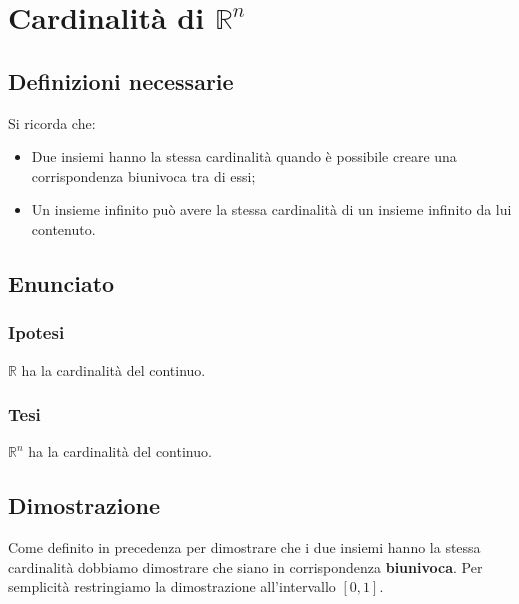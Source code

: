 \documentclass[../../dimostrazioni]{subfiles}
\begin{document}
    \chapter{Cardinalità \texorpdfstring{di \(\mathbb{R}^n\)}{del continuo}}

        \section*{Definizioni necessarie}

            Si ricorda che:

            \begin{itemize}
                \item Due insiemi hanno la stessa cardinalità quando è possibile creare una corrispondenza biunivoca tra di essi;
                \item Un insieme infinito può avere la stessa cardinalità di un insieme infinito da lui contenuto.
            \end{itemize}

        \section*{Enunciato}

            \subsection*{Ipotesi}

            \( \mathbb{R} \) ha la cardinalità del continuo.

            \subsection*{Tesi}

            \( \mathbb{R}^n \) ha la cardinalità del continuo.                

        \section*{Dimostrazione}

            Come definito in precedenza per dimostrare che i due insiemi hanno la stessa cardinalità 
            dobbiamo dimostrare che siano in corrispondenza \textbf{biunivoca}. 
            Per semplicità restringiamo la dimostrazione all'intervallo \([0, 1]\).
            
\end{document}
